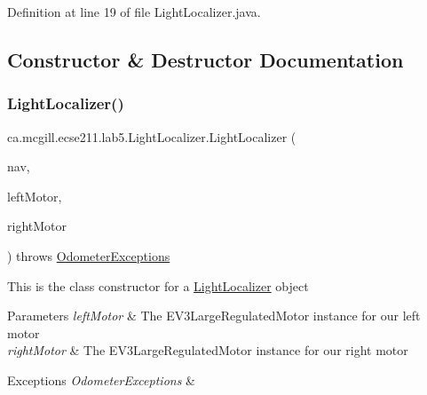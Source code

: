 Definition at line 19 of file Light\+Localizer.\+java.



\subsection{Constructor \& Destructor Documentation}
\mbox{\label{classca_1_1mcgill_1_1ecse211_1_1lab5_1_1_light_localizer_a83dbb9eaea19092e27f6f9acdd35d37a}} 
\subsubsection{\texorpdfstring{Light\+Localizer()}{LightLocalizer()}}
{\footnotesize\ttfamily ca.\+mcgill.\+ecse211.\+lab5.\+Light\+Localizer.\+Light\+Localizer (\begin{DoxyParamCaption}\item[{\hyperlink{classca_1_1mcgill_1_1ecse211_1_1lab5_1_1_navigation}{Navigation}}]{nav,  }\item[{E\+V3\+Large\+Regulated\+Motor}]{left\+Motor,  }\item[{E\+V3\+Large\+Regulated\+Motor}]{right\+Motor }\end{DoxyParamCaption}) throws \hyperlink{classca_1_1mcgill_1_1ecse211_1_1odometer_1_1_odometer_exceptions}{Odometer\+Exceptions}}

This is the class constructor for a \hyperlink{classca_1_1mcgill_1_1ecse211_1_1lab5_1_1_light_localizer}{Light\+Localizer} object


\begin{DoxyParams}{Parameters}
{\em left\+Motor} & The E\+V3\+Large\+Regulated\+Motor instance for our left motor \\
\hline
{\em right\+Motor} & The E\+V3\+Large\+Regulated\+Motor instance for our right motor \\
\hline
\end{DoxyParams}

\begin{DoxyExceptions}{Exceptions}
{\em Odometer\+Exceptions} & \\
\hline
\end{DoxyExceptions}


